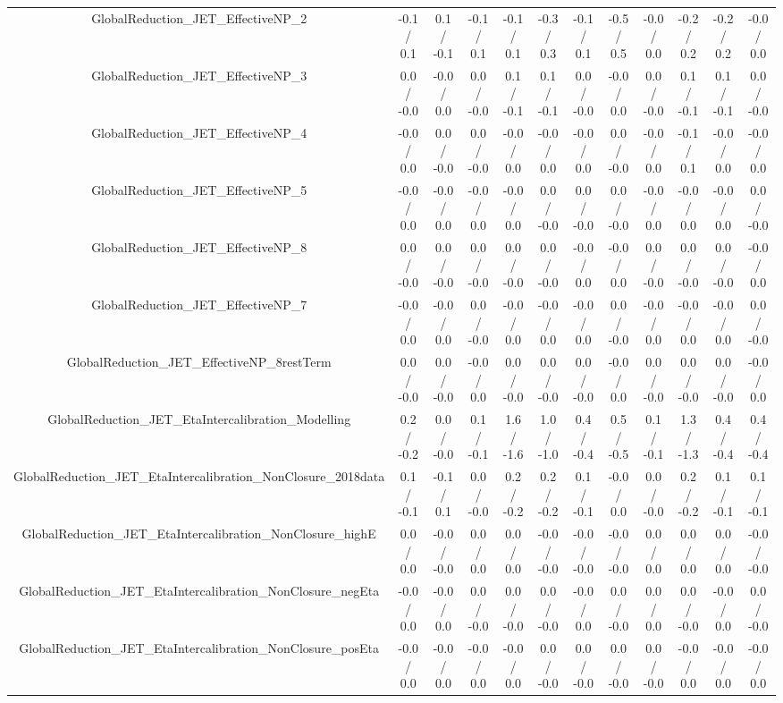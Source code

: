 \begin{table}[htbp]
\begin{center}
\begin{tabular}{|c|c|c|c|c|c|c|c|c|c|c|c|}
  GlobalReduction_JET_EffectiveNP_2 & -0.1 / 0.1 & 0.1 / -0.1 & -0.1 / 0.1 & -0.1 / 0.1 & -0.3 / 0.3 & -0.1 / 0.1 & -0.5 / 0.5 & -0.0 / 0.0 & -0.2 / 0.2 & -0.2 / 0.2 & -0.0 / 0.0 \\ 
  GlobalReduction_JET_EffectiveNP_3 & 0.0 / -0.0 & -0.0 / 0.0 & 0.0 / -0.0 & 0.1 / -0.1 & 0.1 / -0.1 & 0.0 / -0.0 & -0.0 / 0.0 & 0.0 / -0.0 & 0.1 / -0.1 & 0.1 / -0.1 & 0.0 / -0.0 \\ 
  GlobalReduction_JET_EffectiveNP_4 & -0.0 / 0.0 & 0.0 / -0.0 & 0.0 / -0.0 & -0.0 / 0.0 & -0.0 / 0.0 & -0.0 / 0.0 & 0.0 / -0.0 & -0.0 / 0.0 & -0.1 / 0.1 & -0.0 / 0.0 & -0.0 / 0.0 \\ 
  GlobalReduction_JET_EffectiveNP_5 & -0.0 / 0.0 & -0.0 / 0.0 & -0.0 / 0.0 & -0.0 / 0.0 & 0.0 / -0.0 & 0.0 / -0.0 & 0.0 / -0.0 & -0.0 / 0.0 & -0.0 / 0.0 & -0.0 / 0.0 & 0.0 / -0.0 \\ 
  GlobalReduction_JET_EffectiveNP_8 & 0.0 / -0.0 & 0.0 / -0.0 & 0.0 / -0.0 & 0.0 / -0.0 & 0.0 / -0.0 & -0.0 / 0.0 & -0.0 / 0.0 & 0.0 / -0.0 & 0.0 / -0.0 & 0.0 / -0.0 & -0.0 / 0.0 \\ 
  GlobalReduction_JET_EffectiveNP_7 & -0.0 / 0.0 & -0.0 / 0.0 & 0.0 / -0.0 & -0.0 / 0.0 & -0.0 / 0.0 & -0.0 / 0.0 & 0.0 / -0.0 & -0.0 / 0.0 & -0.0 / 0.0 & -0.0 / 0.0 & 0.0 / -0.0 \\ 
  GlobalReduction_JET_EffectiveNP_8restTerm & 0.0 / -0.0 & 0.0 / -0.0 & -0.0 / 0.0 & 0.0 / -0.0 & 0.0 / -0.0 & 0.0 / -0.0 & -0.0 / 0.0 & 0.0 / -0.0 & 0.0 / -0.0 & 0.0 / -0.0 & -0.0 / 0.0 \\ 
  GlobalReduction_JET_EtaIntercalibration_Modelling & 0.2 / -0.2 & 0.0 / -0.0 & 0.1 / -0.1 & 1.6 / -1.6 & 1.0 / -1.0 & 0.4 / -0.4 & 0.5 / -0.5 & 0.1 / -0.1 & 1.3 / -1.3 & 0.4 / -0.4 & 0.4 / -0.4 \\ 
  GlobalReduction_JET_EtaIntercalibration_NonClosure_2018data & 0.1 / -0.1 & -0.1 / 0.1 & 0.0 / -0.0 & 0.2 / -0.2 & 0.2 / -0.2 & 0.1 / -0.1 & -0.0 / 0.0 & 0.0 / -0.0 & 0.2 / -0.2 & 0.1 / -0.1 & 0.1 / -0.1 \\ 
  GlobalReduction_JET_EtaIntercalibration_NonClosure_highE & 0.0 / 0.0 & -0.0 / -0.0 & 0.0 / 0.0 & 0.0 / 0.0 & -0.0 / -0.0 & -0.0 / -0.0 & -0.0 / -0.0 & 0.0 / 0.0 & 0.0 / 0.0 & 0.0 / 0.0 & -0.0 / -0.0 \\ 
  GlobalReduction_JET_EtaIntercalibration_NonClosure_negEta & -0.0 / 0.0 & -0.0 / 0.0 & 0.0 / -0.0 & 0.0 / -0.0 & 0.0 / -0.0 & -0.0 / 0.0 & 0.0 / -0.0 & 0.0 / 0.0 & 0.0 / -0.0 & -0.0 / 0.0 & 0.0 / -0.0 \\ 
  GlobalReduction_JET_EtaIntercalibration_NonClosure_posEta & -0.0 / 0.0 & -0.0 / 0.0 & -0.0 / 0.0 & -0.0 / 0.0 & 0.0 / -0.0 & 0.0 / -0.0 & 0.0 / -0.0 & 0.0 / -0.0 & -0.0 / 0.0 & -0.0 / 0.0 & -0.0 / 0.0 \\ 

\end{tabular}
\end{center}
\end{table}
